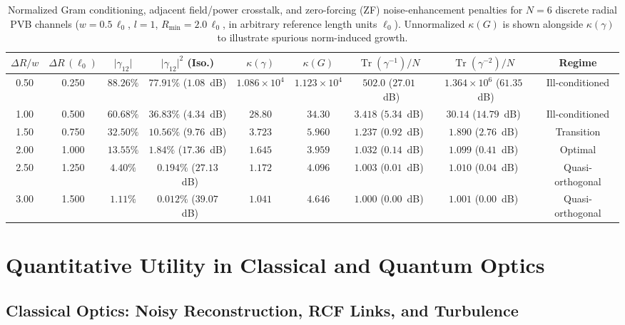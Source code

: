 \documentclass[aps,pra,onecolumn,notitlepage,11pt,tightenlines,amsmath,amssymb,floatfix,longbibliography]{revtex4-2}
\providecommand{\abs}[1]{\lvert#1\rvert}
\begin{document}
\begin{table}[htbp]
\caption{Normalized Gram conditioning, adjacent field/power crosstalk, and zero-forcing (ZF) noise-enhancement penalties for $N = 6$ discrete radial PVB channels ($w = 0.5\,\ell_0$, $l = 1$, $R_{\min} = 2.0\,\ell_0$, in arbitrary reference length units $\ell_0$). Unnormalized $\kappa(G)$ is shown alongside $\kappa(\gamma)$ to illustrate spurious norm-induced growth.}
\label{tab:gram_matrix}
\begin{ruledtabular}
\footnotesize
\setlength{\tabcolsep}{1pt}
\begin{tabular}{ccccccccc}
$\Delta R / w$ & $\Delta R\,(\ell_0)$ & $\abs{\gamma_{12}}$ & $\abs{\gamma_{12}}^2$ (Iso.) & $\kappa(\gamma)$ & $\kappa(G)$ & $\operatorname{Tr}(\gamma^{-1})/N$ & $\operatorname{Tr}(\gamma^{-2})/N$ & Regime \\
\hline
0.50 & 0.250 & $88.26\%$ & $77.91\%$ ($1.08$~dB) & $1.086\times 10^4$ & $1.123\times 10^4$ & $502.0$ ($27.01$~dB) & $1.364\times 10^6$ ($61.35$~dB) & Ill-conditioned \\
1.00 & 0.500 & $60.68\%$ & $36.83\%$ ($4.34$~dB) & $28.80$ & $34.30$ & $3.418$ ($5.34$~dB) & $30.14$ ($14.79$~dB) & Ill-conditioned \\
1.50 & 0.750 & $32.50\%$ & $10.56\%$ ($9.76$~dB) & $3.723$ & $5.960$ & $1.237$ ($0.92$~dB) & $1.890$ ($2.76$~dB) & Transition \\
2.00 & 1.000 & $13.55\%$ & $1.84\%$ ($17.36$~dB) & $1.645$ & $3.959$ & $1.032$ ($0.14$~dB) & $1.099$ ($0.41$~dB) & Optimal \\
2.50 & 1.250 & $4.40\%$ & $0.194\%$ ($27.13$~dB) & $1.172$ & $4.096$ & $1.003$ ($0.01$~dB) & $1.010$ ($0.04$~dB) & Quasi-orthogonal \\
3.00 & 1.500 & $1.11\%$ & $0.012\%$ ($39.07$~dB) & $1.041$ & $4.646$ & $1.000$ ($0.00$~dB) & $1.001$ ($0.00$~dB) & Quasi-orthogonal \\
\end{tabular}
\end{ruledtabular}
\end{table}

\section{Quantitative Utility in Classical and Quantum Optics}
\label{sec:optics_utility}

\subsection{Classical Optics: Noisy Reconstruction, RCF Links, and Turbulence}
\label{subsec:classical_utility}
\end{document}
